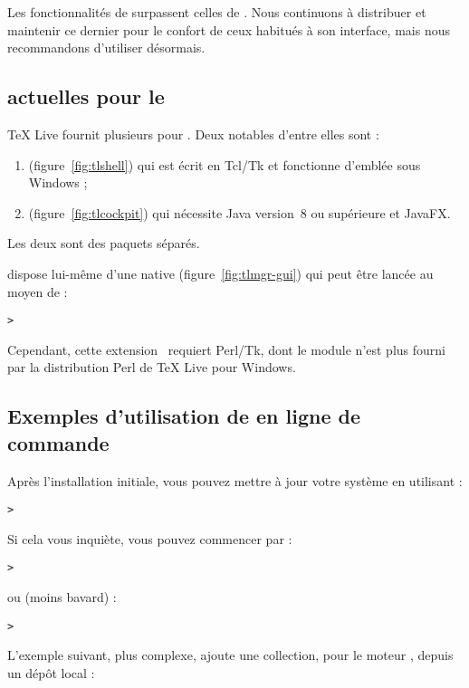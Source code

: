 \documentclass[german, english, french, 12pt]{article}
\renewcommand{\TL}{\TeX{} Live\xspace}%
\begin{document}
Les fonctionnalités de  surpassent celles de . Nous
continuons à distribuer et maintenir ce dernier pour le confort de ceux habitués
à son interface, mais nous recommandons d'utiliser  désormais.

\subsection{\GUI{} actuelles pour le }

\TL{} fournit plusieurs \GUI{} pour . Deux notables d'entre elles
sont :
\begin{enumerate}
\item {} (figure~\ref{fig:tlshell}) qui est écrit en Tcl/Tk et
  fonctionne d'emblée sous Windows ;
\item {} (figure~\ref{fig:tlcockpit}) qui nécessite Java version~8
  ou supérieure et JavaFX.
\end{enumerate}
Les deux sont des paquets séparés.

 dispose lui-même d'une \GUI{} native (figure~\ref{fig:tlmgr-gui})
qui peut être lancée au moyen de :
\begin{alltt}
> 
\end{alltt}
Cependant, cette extension \GUI\ requiert Perl/Tk, dont le module n'est plus
fourni par la distribution Perl de \TL{} pour Windows.

\subsection{Exemples d'utilisation de  en ligne de commande}

Après l'installation initiale, vous pouvez mettre à jour votre système en
utilisant :

\begin{alltt}
> 
\end{alltt}
Si cela vous inquiète, vous pouvez commencer par :
\begin{alltt}
> 
\end{alltt}
ou (moins bavard) :
\begin{alltt}
> 
\end{alltt}

L'exemple suivant, plus complexe, ajoute une collection, pour le moteur \XeTeX,
depuis un dépôt local :
\end{document}
